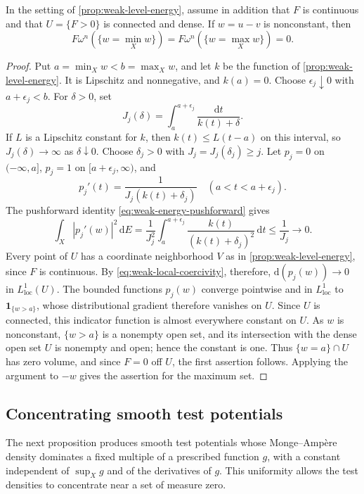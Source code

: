 \begin{lemma}\label{lem:weak-null-extremum-levels}
In the setting of \cref{prop:weak-level-energy}, assume in addition that $F$ is continuous and that $U=\{F>0\}$ is connected and dense. If $w=u-v$ is nonconstant, then
\[
F\omega^n(\{w=\min_Xw\})=F\omega^n(\{w=\max_Xw\})=0.
\]
\end{lemma}

\begin{proof}
Put $a=\min_Xw<b=\max_Xw$, and let $k$ be the function of \cref{prop:weak-level-energy}. It is Lipschitz and nonnegative, and $k(a)=0$. Choose $\epsilon_j\downarrow0$ with $a+\epsilon_j<b$. For $\delta>0$, set
\[
J_j(\delta)=\int_a^{a+\epsilon_j}\frac{\mathrm{d} t}{k(t)+\delta}.
\]
If $L$ is a Lipschitz constant for $k$, then $k(t)\leq L(t-a)$ on this interval, so $J_j(\delta)\to\infty$ as $\delta\downarrow0$. Choose $\delta_j>0$ with $J_j=J_j(\delta_j)\geq j$. Let $p_j=0$ on $(-\infty,a]$, $p_j=1$ on $[a+\epsilon_j,\infty)$, and
\[
p_j'(t)=\frac{1}{J_j(k(t)+\delta_j)}\quad(a<t<a+\epsilon_j).
\]
The pushforward identity \eqref{eq:weak-energy-pushforward} gives
\[
\int_X|p_j'(w)|^2\,\mathrm{d} E
=\frac{1}{J_j^2}\int_a^{a+\epsilon_j}\frac{k(t)}{(k(t)+\delta_j)^2}\,\mathrm{d} t
\leq\frac1{J_j}\longrightarrow0.
\]
Every point of $U$ has a coordinate neighborhood $V$ as in \cref{prop:weak-level-energy}, since $F$ is continuous. By \eqref{eq:weak-local-coercivity}, therefore, $\mathrm{d}(p_j(w))\to0$ in $L^1_{\mathrm{loc}}(U)$. The bounded functions $p_j(w)$ converge pointwise and in $L^1_{\mathrm{loc}}$ to $\mathbf1_{\{w>a\}}$, whose distributional gradient therefore vanishes on $U$. Since $U$ is connected, this indicator function is almost everywhere constant on $U$. As $w$ is nonconstant, $\{w>a\}$ is a nonempty open set, and its intersection with the dense open set $U$ is nonempty and open; hence the constant is one. Thus $\{w=a\}\cap U$ has zero volume, and since $F=0$ off $U$, the first assertion follows. Applying the argument to $-w$ gives the assertion for the maximum set.
\end{proof}

\subsection{Concentrating smooth test potentials}

The next proposition produces smooth test potentials whose Monge--Amp\`ere density dominates a fixed multiple of a prescribed function $g$, with a constant independent of $\sup_Xg$ and of the derivatives of $g$. This uniformity allows the test densities to concentrate near a set of measure zero.

